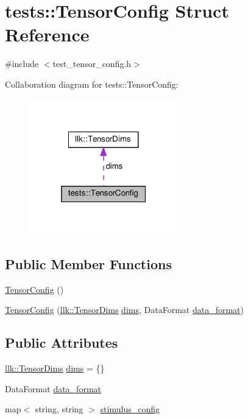 \hypertarget{structtests_1_1TensorConfig}{}\section{tests\+:\+:Tensor\+Config Struct Reference}
\label{structtests_1_1TensorConfig}


{\ttfamily \#include $<$test\+\_\+tensor\+\_\+config.\+h$>$}



Collaboration diagram for tests\+:\+:Tensor\+Config\+:\nopagebreak
\begin{figure}[H]
\begin{center}
\leavevmode
\includegraphics[width=183pt]{structtests_1_1TensorConfig__coll__graph}
\end{center}
\end{figure}
\subsection*{Public Member Functions}
\begin{DoxyCompactItemize}
\item 
\hyperlink{structtests_1_1TensorConfig_ac5ddc9579a693945b75a943441e28cf1}{Tensor\+Config} ()
\item 
\hyperlink{structtests_1_1TensorConfig_a10b3a5e1299b4a687021d4442cf8a611}{Tensor\+Config} (\hyperlink{structllk_1_1TensorDims}{llk\+::\+Tensor\+Dims} \hyperlink{structtests_1_1TensorConfig_a7b27f127ff4b7a04694dfad1d7500244}{dims}, Data\+Format \hyperlink{structtests_1_1TensorConfig_a53af0a893eebf1329c848818dcea1a08}{data\+\_\+format})
\end{DoxyCompactItemize}
\subsection*{Public Attributes}
\begin{DoxyCompactItemize}
\item 
\hyperlink{structllk_1_1TensorDims}{llk\+::\+Tensor\+Dims} \hyperlink{structtests_1_1TensorConfig_a7b27f127ff4b7a04694dfad1d7500244}{dims} = \{\}
\item 
Data\+Format \hyperlink{structtests_1_1TensorConfig_a53af0a893eebf1329c848818dcea1a08}{data\+\_\+format}
\item 
map$<$ string, string $>$ \hyperlink{structtests_1_1TensorConfig_a05d85214444feab610a4e4752f51d176}{stimulus\+\_\+config}
\end{DoxyCompactItemize}


